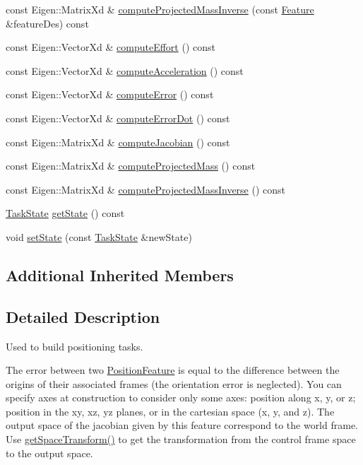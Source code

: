 \begin{DoxyCompactItemize}
\item 
const Eigen\+::\+Matrix\+Xd \& \hyperlink{classocra_1_1PositionFeature_ac268323cc7e0047693b5dde9f53cbc91}{compute\+Projected\+Mass\+Inverse} (const \hyperlink{classocra_1_1Feature}{Feature} \&feature\+Des) const 
\item 
const Eigen\+::\+Vector\+Xd \& \hyperlink{classocra_1_1PositionFeature_aaa17c6177e17c64cd8aac3331e9f9bd4}{compute\+Effort} () const 
\item 
const Eigen\+::\+Vector\+Xd \& \hyperlink{classocra_1_1PositionFeature_a29ff2bb77fea70cfa58559e98e9d910a}{compute\+Acceleration} () const 
\item 
const Eigen\+::\+Vector\+Xd \& \hyperlink{classocra_1_1PositionFeature_a02c11a8a6352390515f3e3d0b9105f0f}{compute\+Error} () const 
\item 
const Eigen\+::\+Vector\+Xd \& \hyperlink{classocra_1_1PositionFeature_a334d7f149947debd48e663a041b7b674}{compute\+Error\+Dot} () const 
\item 
const Eigen\+::\+Matrix\+Xd \& \hyperlink{classocra_1_1PositionFeature_a85a37038afb0bed80a33738ac2be44b0}{compute\+Jacobian} () const 
\item 
const Eigen\+::\+Matrix\+Xd \& \hyperlink{classocra_1_1PositionFeature_aa59a90aa6144e2aefc5106b5bd006167}{compute\+Projected\+Mass} () const 
\item 
const Eigen\+::\+Matrix\+Xd \& \hyperlink{classocra_1_1PositionFeature_a55c34721b665b4f5b5a98e5f3ea3fc4a}{compute\+Projected\+Mass\+Inverse} () const 
\item 
\hyperlink{classocra_1_1TaskState}{Task\+State} \hyperlink{classocra_1_1PositionFeature_a6cfc75eb8fb13318c5b0ba9e0d43fd59}{get\+State} () const 
\item 
void \hyperlink{classocra_1_1PositionFeature_a59ca48f39003aeba08dd8a6e8eec686c}{set\+State} (const \hyperlink{classocra_1_1TaskState}{Task\+State} \&new\+State)
\end{DoxyCompactItemize}
\subsection*{Additional Inherited Members}


\subsection{Detailed Description}
Used to build positioning tasks. 

The error between two \hyperlink{classocra_1_1PositionFeature}{Position\+Feature} is equal to the difference between the origins of their associated frames (the orientation error is neglected). You can specify axes at construction to consider only some axes\+: position along x, y, or z; position in the xy, xz, yz planes, or in the cartesian space (x, y, and z). The output space of the jacobian given by this feature correspond to the world frame. Use \hyperlink{classocra_1_1PositionFeature_a39c3b8fce61d5fbefae27b000efe2425}{get\+Space\+Transform()} to get the transformation from the control frame space to the output space. 


